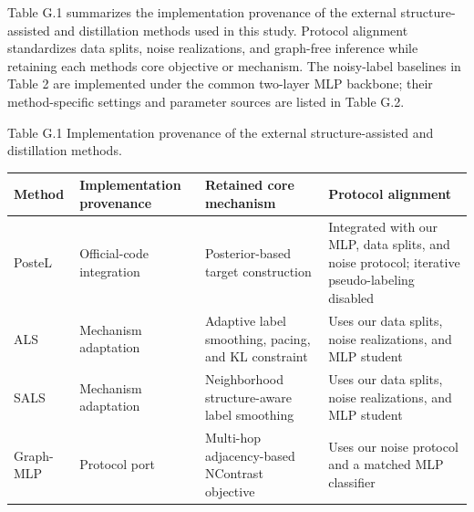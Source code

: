 Table G.1 summarizes the implementation provenance of the external structure-assisted and distillation methods used in this study. Protocol alignment standardizes data splits, noise realizations, and graph-free inference while retaining each method\textquotesingle s core objective or mechanism. The noisy-label baselines in Table 2 are implemented under the common two-layer MLP backbone; their method-specific settings and parameter sources are listed in Table G.2.

Table G.1 Implementation provenance of the external structure-assisted and distillation methods.

{\def\LTcaptype{none} %
\begin{longtable}[]{@{}
  >{\raggedright\arraybackslash}p{}
  >{\centering\arraybackslash}p{}
  >{\centering\arraybackslash}p{}
  >{\centering\arraybackslash}p{}@{}}
\toprule\noalign{}
\begin{minipage}[b]{\linewidth}\raggedright
\textbf{Method}
\end{minipage} & \begin{minipage}[b]{\linewidth}\centering
\textbf{Implementation provenance}
\end{minipage} & \begin{minipage}[b]{\linewidth}\centering
\textbf{Retained core mechanism}
\end{minipage} & \begin{minipage}[b]{\linewidth}\centering
\textbf{Protocol alignment}
\end{minipage} \\
\midrule\noalign{}
\endhead
\bottomrule\noalign{}
\endlastfoot
PosteL & Official-code integration & Posterior-based target construction & Integrated with our MLP, data splits, and noise protocol; iterative pseudo-labeling disabled \\
ALS & Mechanism adaptation & Adaptive label smoothing, pacing, and KL constraint & Uses our data splits, noise realizations, and MLP student \\
SALS & Mechanism adaptation & Neighborhood structure-aware label smoothing & Uses our data splits, noise realizations, and MLP student \\
Graph-MLP & Protocol port & Multi-hop adjacency-based NContrast objective & Uses our noise protocol and a matched MLP classifier \\

\end{longtable}}
